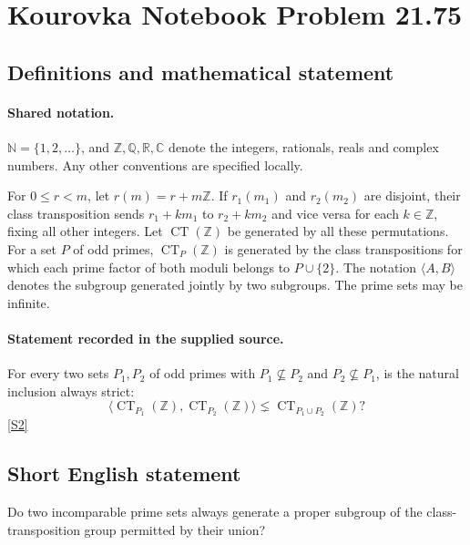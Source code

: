 \documentclass[11pt]{article}
\newcommand{\sref}[2]{\hyperlink{source:#1:#2}{[S#2]}}
\begin{document}
\section{Kourovka Notebook Problem 21.75}\label{statement}

\subsection{Definitions and mathematical statement}

\paragraph{Shared notation.}$\mathbb N=\{1,2,\ldots\}$, and $\mathbb Z,\mathbb Q,\mathbb R,\mathbb C$ denote the integers, rationals, reals and complex numbers. Any other conventions are specified locally.


For $0\leq r<m$, let $r(m)=r+m\mathbb Z$. If $r_1(m_1)$ and $r_2(m_2)$ are disjoint, their class transposition sends $r_1+km_1$ to $r_2+km_2$ and vice versa for each $k\in\mathbb Z$, fixing all other integers. Let $\operatorname{CT}(\mathbb Z)$ be generated by all these permutations. For a set $P$ of odd primes, $\operatorname{CT}_P(\mathbb Z)$ is generated by the class transpositions for which each prime factor of both moduli belongs to $P\cup\{2\}$. The notation $\langle A,B\rangle$ denotes the subgroup generated jointly by two subgroups. The prime sets may be infinite.
\paragraph{Statement recorded in the supplied source.}
For every two sets $P_1,P_2$ of odd primes with $P_1\nsubseteq P_2$ and $P_2\nsubseteq P_1$, is the natural inclusion always strict:
\[
 \langle\operatorname{CT}_{P_1}(\mathbb Z),\operatorname{CT}_{P_2}(\mathbb Z)\rangle
 \lneq\operatorname{CT}_{P_1\cup P_2}(\mathbb Z)?
\] \sref{statement}{2}
\subsection{Short English statement}
Do two incomparable prime sets always generate a proper subgroup of the class-transposition group permitted by their union?
\end{document}
